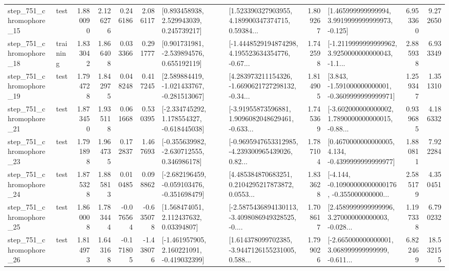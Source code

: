 \begin{tabular}{llrrrrllrlrr}
  step\_751\_chromophore\_15 &      test &      1.880090 &    2.126276 &      0.246186 &  2.086117 &     [0.893458938, 2.529943039, 0.245739217] &  [1.523390327903955, 4.189900347374715, 0.59384... &       1.809267 &    [1.465999999999994, 3.9919999999999973, -0.125] &            6.953360 &          9.272650 \\
  step\_751\_chromophore\_18 &  training &      1.833042 &    1.866408 &      0.033366 &  0.291777 &    [0.901731981, -2.539894576, 0.655192119] &  [-1.4448529194874298, 4.195523634354776, -0.67... &       1.742598 &  [-1.2119999999999962, 3.9250000000000043, -1.1... &            2.885938 &          6.933349 \\
  step\_751\_chromophore\_19 &      test &      1.794728 &    1.842975 &      0.048248 &  0.417245 &   [2.589884419, -1.021433767, -0.281513067] &  [4.283973211154326, -1.6690621727298132, -0.34... &       1.814905 &   [3.843, -1.591000000000001, -0.3609999999999971] &            1.259347 &          1.351310 \\
  step\_751\_chromophore\_21 &      test &      1.873450 &    1.935118 &      0.061668 &  0.530395 &   [-2.334745292, 1.178554327, -0.618445038] &  [-3.91955873596881, 1.9096082048629461, -0.633... &       1.745369 &  [-3.602000000000002, 1.7890000000000015, -0.88... &            0.939685 &          4.186332 \\
  step\_751\_chromophore\_23 &      test &      1.791898 &    1.964735 &      0.172837 &  1.467693 &   [-0.355639982, -2.630712555, 0.346986178] &  [-0.9695947653312985, -4.239300965439026, 0.82... &       1.787104 &   [0.4670000000000005, 4.134, -0.4399999999999977] &            1.880811 &          7.922284 \\
  step\_751\_chromophore\_24 &      test &      1.875328 &    1.885813 &      0.010485 &  0.098862 &  [-2.682196459, -0.059103476, -0.351698479] &  [4.485384870683251, 0.2104295217873872, 0.0553... &       1.833628 &  [-4.144, -0.10900000000000176, -0.355000000000... &            2.585179 &          4.350451 \\
  step\_751\_chromophore\_25 &      test &      1.860008 &    1.783444 &     -0.076564 & -0.635078 &      [1.568474051, 2.112437632, 0.03394807] &  [-2.5875436894130113, -3.4098086949328525, -0.... &       1.708617 &  [2.4589999999999996, 3.270000000000003, -0.028... &            1.197338 &          6.790232 \\
  step\_751\_chromophore\_26 &      test &      1.814973 &    1.643168 &     -0.171805 & -1.438076 &   [-1.461957905, 2.160221091, -0.419032399] &  [1.614378099702385, -3.9447126155231005, 0.588... &       1.799026 &  [-2.665000000000001, 3.068999999999999, -0.611... &            6.822469 &         18.532155 \\

\end{tabular}
